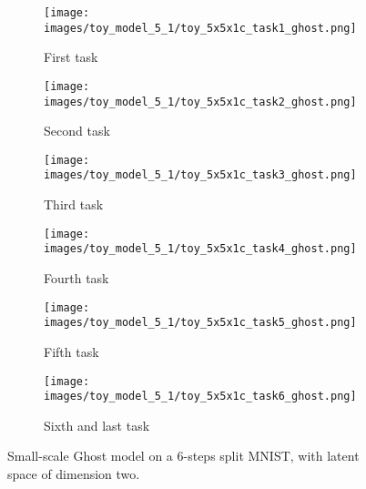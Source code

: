 \begin{figure}
    \centering
    \begin{subfigure}{.33\textwidth}
        \centering
        \texttt{[image: images/toy\_model\_5\_1/toy\_5x5x1c\_task1\_ghost.png]}
        \caption{First task}
        \label{fig:toy_6steps_ghost_1}
    \end{subfigure}%
    \begin{subfigure}{.33\textwidth}
        \centering
        \texttt{[image: images/toy\_model\_5\_1/toy\_5x5x1c\_task2\_ghost.png]}
        \caption{Second task}
        \label{fig:toy_6steps_ghost_2}
    \end{subfigure}
    \begin{subfigure}{.33\textwidth}
        \centering
        \texttt{[image: images/toy\_model\_5\_1/toy\_5x5x1c\_task3\_ghost.png]}
        \caption{Third task}
        \label{fig:toy_6steps_ghost_3}
    \end{subfigure}

    \begin{subfigure}{.33\textwidth}
        \centering
        \texttt{[image: images/toy\_model\_5\_1/toy\_5x5x1c\_task4\_ghost.png]}
        \caption{Fourth task}
        \label{fig:toy_6steps_ghost_4}
    \end{subfigure}
    \begin{subfigure}{.33\textwidth}
        \centering
        \texttt{[image: images/toy\_model\_5\_1/toy\_5x5x1c\_task5\_ghost.png]}
        \caption{Fifth task}
        \label{fig:toy_6steps_ghost_5}
    \end{subfigure}
    \begin{subfigure}{.30\textwidth}
        \centering
        \texttt{[image: images/toy\_model\_5\_1/toy\_5x5x1c\_task6\_ghost.png]}
        \caption{Sixth and last task}
        \label{fig:toy_6steps_ghost_6}
    \end{subfigure}

    \caption{Small-scale Ghost model on a 6-steps split MNIST, with latent space of dimension two.}
    \label{fig:toy_6steps_ghost}
\end{figure}
